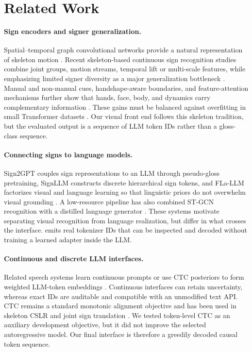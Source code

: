 \section{Related Work}

\paragraph{Sign encoders and signer generalization.}
Spatial--temporal graph convolutional networks provide a natural representation of
skeleton motion \citep{yan2018stgcn}.  Recent skeleton-based continuous sign
recognition studies combine joint groups, motion streams, temporal lift or
multi-scale features, while emphasizing limited signer diversity as a major
generalization bottleneck
\citep{min2025skeleton,nam2026liftsign,wang2025stnet}.  Manual and non-manual cues,
handshape-aware boundaries, and feature-attention mechanisms further show that
hands, face, body, and dynamics carry complementary information
\citep{harrouch2026manual,zhao2026multimodal,yenisari2025multifeature}.  These gains
must be balanced against overfitting in small Transformer datasets
\citep{huamaniLessIsMore}.  Our visual front end follows this skeleton tradition,
but the evaluated output is a sequence of LLM token IDs rather than a gloss-class
sequence.

\paragraph{Connecting signs to language models.}
Sign2GPT couples sign representations to an LLM through pseudo-gloss pretraining,
SignLLM constructs discrete hierarchical sign tokens, and FLa-LLM factorizes visual
and language learning so that linguistic priors do not overwhelm visual grounding
\citep{wong2024sign2gpt,gong2024signllm,chen2024flallm}.  A low-resource pipeline
has also combined ST-GCN recognition with a distilled language generator
\citep{pai2026tsl}.  These systems motivate separating visual recognition from
language realization, but differ in what crosses the interface.  \system{} emits
real tokenizer IDs that can be inspected and decoded without training a learned
adapter inside the LLM.

\paragraph{Continuous and discrete LLM interfaces.}
Related speech systems learn continuous prompts or use CTC posteriors to form
weighted LLM-token embeddings \citep{deng2025wav2prompt,ma2025legoslm}.  Continuous
interfaces can retain uncertainty, whereas exact IDs are auditable and compatible
with an unmodified text API.  CTC remains a standard monotonic alignment objective
\citep{graves2006ctc} and has been used in skeleton CSLR and joint sign translation
\citep{min2025skeleton,nam2026liftsign,camgoz2020signtransformers,tan2025textctc}.
We tested token-level CTC as an auxiliary development objective, but it did not
improve the selected autoregressive model.  Our final interface is therefore a
greedily decoded causal token sequence.

